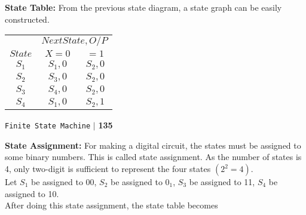 \documentclass{article}
\begin{document}
\vspace*{0.2cm}
\textbf{State Table:} From the previous state diagram, a state graph can be easily constructed.\\
\begin{center}
\begin{tabular}{ccc}
 \hline

 \hline

 \hline

 \hline
 & \multicolumn{2}{c}{$Next State, O/P$}\\
 \cline{2-3}
 $State$ &  $X=0$ & $=1$\\
\hline
$S_1$ & $S_1, 0$  & $S_2, 0$\\
$S_2$ & $S_3, 0$  & $S_2, 0$\\
$S_3$ & $S_4, 0$  & $S_2, 0$\\
$S_4$ & $S_1, 0$  & $S_2, 1$\\
 \hline

 \hline

 \hline

 \hline
\end{tabular}
\end{center}

\newpage
\begin{flushright}
 \texttt{Finite State Machine} \hspace*{0.1cm}\textbf{$|$} \hspace*{0.1cm} \textbf{135}\hspace*{0.1cm}
\end{flushright}
\vspace*{0.5cm}

\textbf{State Assignment:} For making a digital circuit, the states must be assigned to some binary numbers.
This is called state assignment. As the number of states is 4, only two-digit is sufficient to represent the
four states $(2^2 = 4)$.\\
\hspace*{0.5cm} Let $S_1$ be assigned to 00, $S_2$ be assigned to $0_1$, $S_3$ be assigned to 11, $S_4$ be assigned to 10.\\
\hspace*{0.5cm} After doing this state assignment, the state table becomes\\
\end{document}
